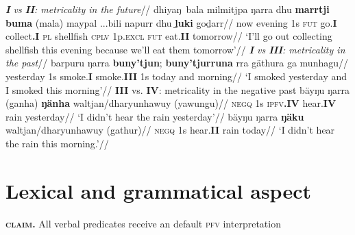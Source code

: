 \documentclass[11pt]{article}
\begin{document}
\pex\a\begingl\glpreamble\textit{ \textbf{I} vs \textbf{II}: metricality in the future}//
\gla dhiyaŋ~bala milmitjpa ŋarra dhu \textbf{marrtji} \textbf{buma} (mala) maypal ...bili napurr dhu \textbf{ḻuki} goḏarr//
\glb now evening 1s \textsc{fut} go.\textbf{I} collect\textbf{.I} \textsc{pl} shellfish \textsc{cplv} 1p\textsc{.excl} \textsc{fut} eat.\textbf{II} tomorrow//
\glft`I'll go out collecting shellfish this evening because we'll eat them tomorrow'\trailingcitation{[AW~20150415]}//\endgl
\a\begingl\glpreamble \textit{\textbf{I} vs \textbf{III}: metricality in the past}//
\gla  barpuru ŋarra \textbf{buny'tjun}; \textbf{buny'tjurruna} rra gäthura ga munhagu//
\glb yesterday 1s smoke.\textbf{I} smoke.\textbf{III} 1s today and morning//
\glft`I smoked yesterday and I smoked this morning'\trailingcitation{[BM20190416]}//\endgl
\xe
\pex \textbf{III} vs. \textbf{IV}: metricality in the negative past
\a\begingl\gla  bäyŋu ŋarra (ganha) \textbf{ŋänha} waltjan/dharyunhawuy (yawungu)//
\glb \textsc{negq} 1s \textsc{ipfv}\textbf{.IV} hear.\textbf{IV} rain yesterday//
\glft`I didn't hear the rain yesterday'\trailingcitation{[AW20190422]}//\endgl
\a\begingl\gla bäyŋu ŋarra \textbf{ŋäku} waltjan/dharyunhawuy (gathur)//
\glb \textsc{negq} 1s hear.\textbf{II} rain today//
\glft`I didn't hear the rain this morning.'\trailingcitation{[AW20190422]}//\endgl\xe


\section{Lexical and grammatical aspect}
\begin{framed}\centering
	\textbf{\textsc{claim.}} All verbal predicates receive an default \textsc{pfv} interpretation
\end{framed}
\end{document}
